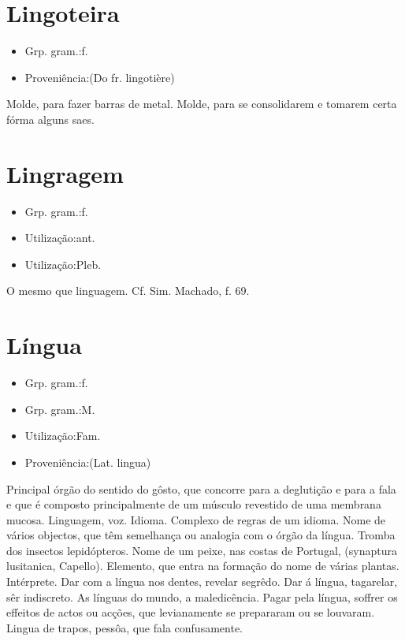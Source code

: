 \section{Lingoteira}
\begin{itemize}
\item {Grp. gram.:f.}
\end{itemize}
\begin{itemize}
\item {Proveniência:(Do fr. \textunderscore lingotière\textunderscore )}
\end{itemize}
Molde, para fazer barras de metal.
Molde, para se consolidarem e tomarem certa fórma alguns saes.
\section{Lingragem}
\begin{itemize}
\item {Grp. gram.:f.}
\end{itemize}
\begin{itemize}
\item {Utilização:ant.}
\end{itemize}
\begin{itemize}
\item {Utilização:Pleb.}
\end{itemize}
O mesmo que \textunderscore linguagem\textunderscore . Cf. Sim. Machado, f. 69.
\section{Língua}
\begin{itemize}
\item {Grp. gram.:f.}
\end{itemize}
\begin{itemize}
\item {Grp. gram.:M.}
\end{itemize}
\begin{itemize}
\item {Utilização:Fam.}
\end{itemize}
\begin{itemize}
\item {Proveniência:(Lat. \textunderscore lingua\textunderscore )}
\end{itemize}
Principal órgão do sentido do gôsto, que concorre para a deglutição e para a fala e que é composto principalmente de um músculo revestido de uma membrana mucosa.
Linguagem, voz.
Idioma.
Complexo de regras de um idioma.
Nome de vários objectos, que têm semelhança ou analogia com o órgão da língua.
Tromba dos insectos lepidópteros.
Nome de um peixe, nas costas de Portugal, (\textunderscore synaptura lusitanica\textunderscore , Capello).
Elemento, que entra na formação do nome de várias plantas.
Intérprete.
\textunderscore Dar com a língua nos dentes\textunderscore , revelar segrêdo.
\textunderscore Dar á língua\textunderscore , tagarelar, sêr indiscreto.
\textunderscore As línguas do mundo\textunderscore , a maledicência.
\textunderscore Pagar pela língua\textunderscore , soffrer os effeitos de actos ou acções, que levianamente se prepararam ou se louvaram.
\textunderscore Lingua de trapos\textunderscore , pessôa, que fala confusamente.
